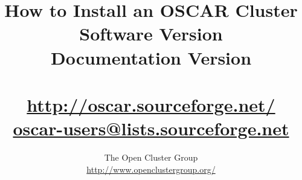 %
%
%

\title{How to Install an OSCAR Cluster \\
Software Version \oscarversion \\
Documentation Version \docsversion \\
\ \\
\url{http://oscar.sourceforge.net/} \\
\href{mailto:oscar-users@lists.sourceforge.net}{oscar-users@lists.sourceforge.net}}

\author{The Open Cluster Group \\
\url{http://www.openclustergroup.org/}}
\maketitle
